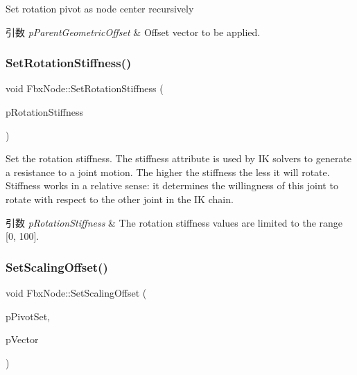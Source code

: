 Set rotation pivot as node center recursively 
\begin{DoxyParams}{引数}
{\em p\+Parent\+Geometric\+Offset} & Offset vector to be applied. \\
\hline
\end{DoxyParams}
\mbox{\label{class_fbx_node_aebaed5a99d859e714aed823b221860ee}} 
\subsubsection{\texorpdfstring{Set\+Rotation\+Stiffness()}{SetRotationStiffness()}}
{\footnotesize\ttfamily void Fbx\+Node\+::\+Set\+Rotation\+Stiffness (\begin{DoxyParamCaption}\item[{\hyperlink{class_fbx_vector4}{Fbx\+Vector4}}]{p\+Rotation\+Stiffness }\end{DoxyParamCaption})}

Set the rotation stiffness. The stiffness attribute is used by IK solvers to generate a resistance to a joint motion. The higher the stiffness the less it will rotate. Stiffness works in a relative sense\+: it determines the willingness of this joint to rotate with respect to the other joint in the IK chain. 
\begin{DoxyParams}{引数}
{\em p\+Rotation\+Stiffness} & The rotation stiffness values are limited to the range \mbox{[}0, 100\mbox{]}. \\
\hline
\end{DoxyParams}
\mbox{\label{class_fbx_node_ac4d24834873de9d73785794d4268441c}} 
\subsubsection{\texorpdfstring{Set\+Scaling\+Offset()}{SetScalingOffset()}}
{\footnotesize\ttfamily void Fbx\+Node\+::\+Set\+Scaling\+Offset (\begin{DoxyParamCaption}\item[{\hyperlink{class_fbx_node_ae62b7311ac4727654cdf1ebd5cbf7343}{E\+Pivot\+Set}}]{p\+Pivot\+Set,  }\item[{\hyperlink{class_fbx_vector4}{Fbx\+Vector4}}]{p\+Vector }\end{DoxyParamCaption})}

